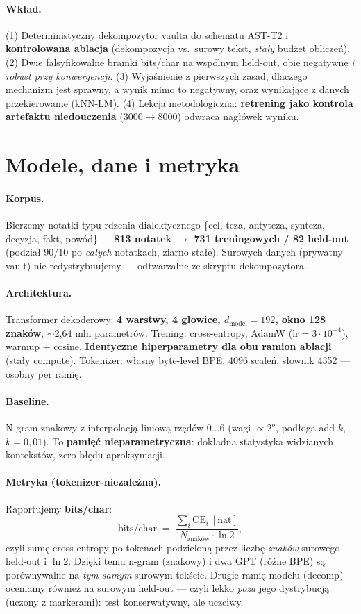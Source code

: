 \documentclass[11pt]{article}
\begin{document}
\paragraph{Wkład.} (1) Deterministyczny dekompozytor vaulta do schematu AST-T2 i \textbf{kontrolowana ablacja}
(dekompozycja vs.\ surowy tekst, \emph{stały} budżet obliczeń). (2) Dwie falsyfikowalne bramki bits/char na
wspólnym held-out, obie negatywne \emph{i robust przy konwergencji}. (3) Wyjaśnienie z pierwszych zasad, dlaczego
mechanizm jest sprawny, a wynik mimo to negatywny, oraz wynikające z danych przekierowanie (kNN-LM). (4) Lekcja
metodologiczna: \textbf{retrening jako kontrola artefaktu niedouczenia} (3000$\to$8000) odwraca nagłówek wyniku.

\section{Modele, dane i metryka}
\paragraph{Korpus.} Bierzemy notatki typu rdzenia dialektycznego \{cel, teza, antyteza, synteza, decyzja, fakt,
powód\} --- \textbf{813 notatek $\to$ 731 treningowych / 82 held-out} (podział 90/10 po \emph{całych} notatkach,
ziarno stałe). Surowych danych (prywatny vault) nie redystrybuujemy --- odtwarzalne ze skryptu dekompozytora.

\paragraph{Architektura.} Transformer dekoderowy: \textbf{4 warstwy, 4 głowice, $d_\text{model}=192$, okno 128
znaków}, $\sim$2{,}64 mln parametrów. Trening: cross-entropy, AdamW ($\text{lr}=3\cdot10^{-4}$), warmup + cosine.
\textbf{Identyczne hiperparametry dla obu ramion ablacji} (stały compute). Tokenizer: własny byte-level BPE,
4096 scaleń, słownik 4352 --- osobny per ramię.

\paragraph{Baseline.} N-gram znakowy z interpolacją liniową rzędów $0\ldots6$ (wagi $\propto 2^o$, podłoga add-$k$,
$k=0{,}01$). To \textbf{pamięć nieparametryczna}: dokładna statystyka widzianych kontekstów, zero błędu aproksymacji.

\paragraph{Metryka (tokenizer-niezależna).} Raportujemy \textbf{bits/char}:
\[
\text{bits/char} \;=\; \frac{\sum_i \text{CE}_i\ [\text{nat}]}{N_\text{znaków}\cdot \ln 2},
\]
czyli sumę cross-entropy po tokenach podzieloną przez liczbę \emph{znaków} surowego held-out i $\ln 2$. Dzięki temu
n-gram (znakowy) i dwa GPT (różne BPE) są porównywalne na \emph{tym samym} surowym tekście. Drugie ramię modelu
(decomp) oceniamy również na surowym held-out --- czyli lekko \emph{poza} jego dystrybucją (uczony z markerami):
test konserwatywny, ale uczciwy.
\end{document}
